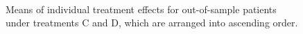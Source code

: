 	\begin{figure}[ht!]
		\begin{center}
			\\
		\end{center}
		\caption{Means of individual treatment effects for out-of-sample patients under treatments C and D, which are arranged into ascending order.}
		\label{fig4_8}
	\end{figure}
